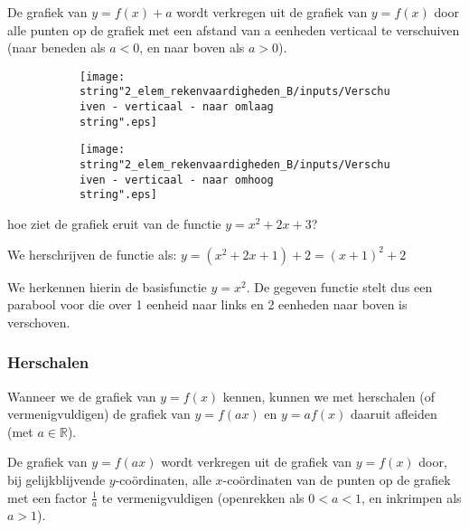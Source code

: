 De grafiek van $y=f(x)+a$ wordt verkregen uit de grafiek
van $y=f(x)$ door alle punten op de grafiek met een afstand van a
eenheden verticaal te verschuiven (naar beneden als $a<0$, en naar
boven als $a>0$).



\begin{figure}[h]
	\centering
	\begin{subfigure}{.48\linewidth}
		\texttt{[image: \\string"2\_elem\_rekenvaardigheden\_B/inputs/Verschuiven - verticaal - naar omlaag\\string".eps]}
	\end{subfigure}
	\begin{subfigure}{.48\linewidth}
		\texttt{[image: \\string"2\_elem\_rekenvaardigheden\_B/inputs/Verschuiven - verticaal - naar omhoog\\string".eps]}
	\end{subfigure}
\end{figure}



\begin{voorbeeld}
hoe ziet de grafiek eruit van de functie $y=x^{2}+2x+3$?

We herschrijven de functie als: $y=\left(x^{2}+2x+1\right)+2=\left(x+1\right)^{2}+2$

We herkennen hierin de basisfunctie $y=x^{2}$. De gegeven functie
stelt dus een parabool voor die over 1 eenheid naar links en 2 eenheden
naar boven is verschoven.
\end{voorbeeld}


\subsubsection{Herschalen}

Wanneer we de grafiek van $y=f(x)$ kennen, kunnen we met
herschalen (of vermenigvuldigen) de grafiek van $y=f(ax)$ en $y=af(x)$
daaruit afleiden (met $a\in\mathbb{R}$).

De grafiek van $y=f(ax)$ wordt verkregen uit de grafiek
van $y=f(x)$ door, bij gelijkblijvende $y$-co\"ordinaten, alle $x$-co\"ordinaten
van de punten op de grafiek met een factor $\frac{1}{a}$ te vermenigvuldigen
(openrekken als $0<a<1$, en inkrimpen als $a>1$).

